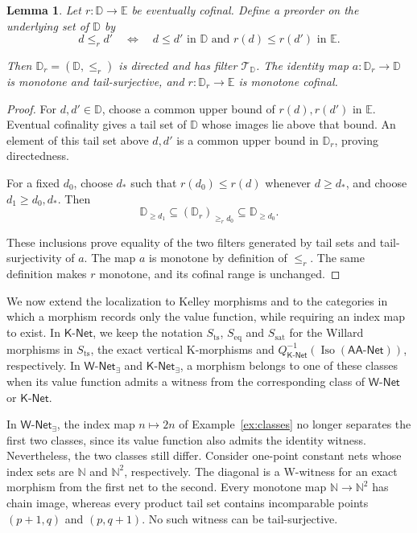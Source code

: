 \documentclass[11pt,a4paper]{article}
\newtheorem{lemma}[theorem]{Lemma}
\theoremstyle{definition}
\theoremstyle{remark}
\newcommand{\Wpar}{\mathsf{W\text{-}Net}}
\newcommand{\Kpar}{\mathsf{K\text{-}Net}}
\newcommand{\Wex}{\mathsf{W\text{-}Net}_{\exists}}
\newcommand{\Kex}{\mathsf{K\text{-}Net}_{\exists}}
\newcommand{\NetAA}{\mathsf{AA\text{-}Net}}
\newcommand{\TT}{\mathcal T}
\newcommand{\NN}{\mathbb N}
\newcommand{\Iso}{\operatorname{Iso}}
\newcommand{\Sts}{S_{\mathrm{ts}}}
\newcommand{\Seq}{S_{\mathrm{eq}}}
\newcommand{\Ssat}{S_{\mathrm{sat}}}
\begin{document}
\begin{lemma}\label{lem:korder}
Let \(r:\mathbb D\to\mathbb E\) be eventually cofinal. Define
a preorder on the underlying set of \(\mathbb D\) by
\[
 d\le_r d'\quad\Leftrightarrow\quad
 d\le d'\text{ in }\mathbb D
 \text{ and }r(d)\le r(d')\text{ in }\mathbb E.
\]

Then \(\mathbb D_r=(\mathbb D,\le_r)\) is directed and has
filter \(\TT_{\mathbb D}\). The identity map
\(a:\mathbb D_r\to\mathbb D\) is monotone and tail-surjective,
and \(r:\mathbb D_r\to\mathbb E\) is monotone cofinal.
\end{lemma}
\begin{proof}
For \(d,d'\in\mathbb D\), choose a common upper bound of
\(r(d),r(d')\) in \(\mathbb E\). Eventual cofinality gives
a tail set of \(\mathbb D\) whose images lie above that bound.
An element of this tail set above \(d,d'\) is a common upper bound
in \(\mathbb D_r\), proving directedness.

For a fixed \(d_0\), choose \(d_*\) such that
\(r(d_0)\le r(d)\) whenever \(d\ge d_*\), and choose
\(d_1\ge d_0,d_*\). Then
\[
 \mathbb D_{\ge d_1}
 \subseteq(\mathbb D_r)_{\ge_r d_0}
 \subseteq\mathbb D_{\ge d_0}.
\]

These inclusions prove equality of the two filters generated by tail sets and
tail-surjectivity of \(a\). The map \(a\) is monotone by
definition of \(\le_r\). The same definition makes \(r\)
monotone, and its cofinal range is unchanged.
\end{proof}

We now extend the localization to Kelley morphisms and to the categories
in which a morphism records only the value function, while requiring an
index map to exist.
In \(\Kpar\), we keep the notation \(\Sts\), \(\Seq\) and \(\Ssat\)
for the Willard morphisms in \(\Sts\), the exact vertical
K-morphisms and \(Q_{\Kpar}^{-1}(\Iso(\NetAA))\), respectively.
In \(\Wex\) and \(\Kex\), a morphism belongs to one of
these classes when its value function admits a witness from the
corresponding class of \(\Wpar\) or \(\Kpar\).

In \(\Wex\), the index map \(n\mapsto2n\) of Example~\ref{ex:classes}
no longer separates the first two classes, since its value function
also admits the identity witness. Nevertheless, the two classes still
differ. Consider one-point constant nets whose index sets are \(\NN\)
and \(\NN^2\), respectively. The diagonal is a W-witness for an exact
morphism from the first net to the second. Every monotone map
\(\NN\to\NN^2\) has chain image, whereas every product tail set
contains incomparable points \((p+1,q)\) and \((p,q+1)\).
No such witness can be tail-surjective.
\end{document}
